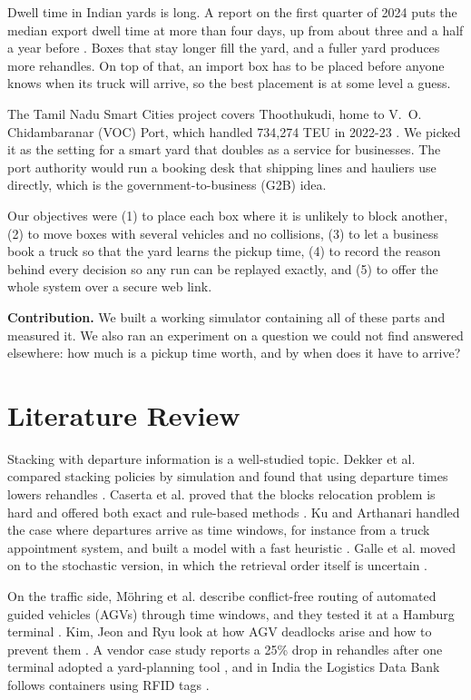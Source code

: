 \documentclass[conference]{IEEEtran}
\begin{document}
Dwell time in Indian yards is long. A report on the first quarter of 2024 puts the median export dwell time at more than four days, up from about three and a half a year before \cite{bw2024}. Boxes that stay longer fill the yard, and a fuller yard produces more rehandles. On top of that, an import box has to be placed before anyone knows when its truck will arrive, so the best placement is at some level a guess.

The Tamil Nadu Smart Cities project covers Thoothukudi, home to V.~O. Chidambaranar (VOC) Port, which handled 734,274 TEU in 2022-23 \cite{wikivoc}. We picked it as the setting for a smart yard that doubles as a service for businesses. The port authority would run a booking desk that shipping lines and hauliers use directly, which is the government-to-business (G2B) idea.

Our objectives were (1) to place each box where it is unlikely to block another, (2) to move boxes with several vehicles and no collisions, (3) to let a business book a truck so that the yard learns the pickup time, (4) to record the reason behind every decision so any run can be replayed exactly, and (5) to offer the whole system over a secure web link.

\textbf{Contribution.} We built a working simulator containing all of these parts and measured it. We also ran an experiment on a question we could not find answered elsewhere: how much is a pickup time worth, and by when does it have to arrive?

\section{Literature Review}
Stacking with departure information is a well-studied topic. Dekker et al. compared stacking policies by simulation and found that using departure times lowers rehandles \cite{dekker2006}. Caserta et al. proved that the blocks relocation problem is hard and offered both exact and rule-based methods \cite{caserta2012}. Ku and Arthanari handled the case where departures arrive as time windows, for instance from a truck appointment system, and built a model with a fast heuristic \cite{ku2016}. Galle et al. moved on to the stochastic version, in which the retrieval order itself is uncertain \cite{galle2017}.

On the traffic side, M\"ohring et al. describe conflict-free routing of automated guided vehicles (AGVs) through time windows, and they tested it at a Hamburg terminal \cite{mohring2005}. Kim, Jeon and Ryu look at how AGV deadlocks arise and how to prevent them \cite{kim2007}. A vendor case study reports a 25\% drop in rehandles after one terminal adopted a yard-planning tool \cite{kaleris2023}, and in India the Logistics Data Bank follows containers using RFID tags \cite{ldb}.
\end{document}
